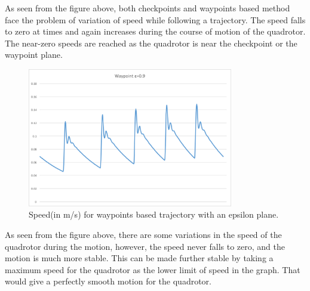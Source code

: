 \documentclass[hidelinks,BTech]{iitmdiss}
\begin{document}
As seen from the figure above, both checkpoints and waypoints based method face the problem of variation of speed while following a trajectory. The speed falls to zero at times and again increases during the course of motion of the quadrotor. The near-zero speeds are reached as the quadrotor is near the checkpoint or the waypoint plane.
\begin{figure}[H]
  \centering
    \includegraphics[width=0.8\textwidth]{Waypoints_speed_0_9.png}
    \caption{Speed(in m/s) for waypoints based trajectory with an epsilon plane.}
\end{figure}
As seen from the figure above, there are some variations in the speed of the quadrotor during the motion, however, the speed never falls to zero, and the motion is much more stable. This can be made further stable by taking a maximum speed for the quadrotor as the lower limit of speed in the graph. That would give a perfectly smooth motion for the quadrotor.
\end{document}
